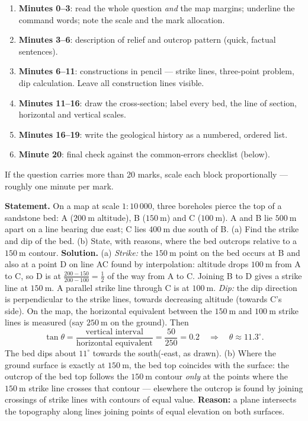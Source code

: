 \documentclass[11pt]{article}
\newcommand{\cle}[1]{{\popxbold\color{popdark}#1}}
\begin{document}
\begin{methode}
\begin{enumerate}
\item \textbf{Minutes 0--3}: read the whole question \emph{and} the map margins; underline the command words; note the scale and the mark allocation.
\item \textbf{Minutes 3--6}: description of relief and outcrop pattern (quick, factual sentences).
\item \textbf{Minutes 6--11}: constructions in pencil --- strike lines, three-point problem, dip calculation. Leave all construction lines visible.
\item \textbf{Minutes 11--16}: draw the cross-section; label every bed, the line of section, horizontal and vertical scales.
\item \textbf{Minutes 16--19}: write the geological history as a numbered, ordered list.
\item \textbf{Minute 20}: final check against the common-errors checklist (below).
\end{enumerate}
If the question carries more than 20 marks, scale each block proportionally --- roughly one minute per mark.
\end{methode}

\begin{exoresolu}
\textbf{Statement.} On a map at scale $1:10\,000$, three boreholes pierce the top of a sandstone bed: A ($200\ \mathrm{m}$ altitude), B ($150\ \mathrm{m}$) and C ($100\ \mathrm{m}$). A and B lie $500\ \mathrm{m}$ apart on a line bearing due east; C lies $400\ \mathrm{m}$ due south of B. (a) Find the strike and dip of the bed. (b) State, with reasons, where the bed outcrops relative to a $150\ \mathrm{m}$ contour.
\tcblower
\textbf{Solution.} (a) \emph{Strike:} the $150\ \mathrm{m}$ point on the bed occurs at B and also at a point D on line AC found by interpolation: altitude drops $100\ \mathrm{m}$ from A to C, so D is at $\tfrac{200-150}{200-100} = \tfrac{1}{2}$ of the way from A to C. Joining B to D gives a \cle{strike line} at $150\ \mathrm{m}$. A parallel strike line through C is at $100\ \mathrm{m}$. \emph{Dip:} the dip direction is perpendicular to the strike lines, towards decreasing altitude (towards C's side). On the map, the horizontal equivalent between the $150\ \mathrm{m}$ and $100\ \mathrm{m}$ strike lines is measured (say $250\ \mathrm{m}$ on the ground). Then
\[ \tan\theta = \frac{\text{vertical interval}}{\text{horizontal equivalent}} = \frac{50}{250} = 0.2 \quad\Rightarrow\quad \theta \approx 11.3^{\circ}. \]
The bed dips about $11^{\circ}$ towards the south(-east, as drawn). (b) Where the ground surface is exactly at $150\ \mathrm{m}$, the bed top coincides with the surface: the outcrop of the bed top follows the $150\ \mathrm{m}$ contour \emph{only} at the points where the $150\ \mathrm{m}$ strike line crosses that contour --- elsewhere the outcrop is found by joining crossings of strike lines with contours of equal value. \textbf{Reason:} a plane intersects the topography along lines joining points of equal elevation on both surfaces.
\end{exoresolu}
\end{document}
